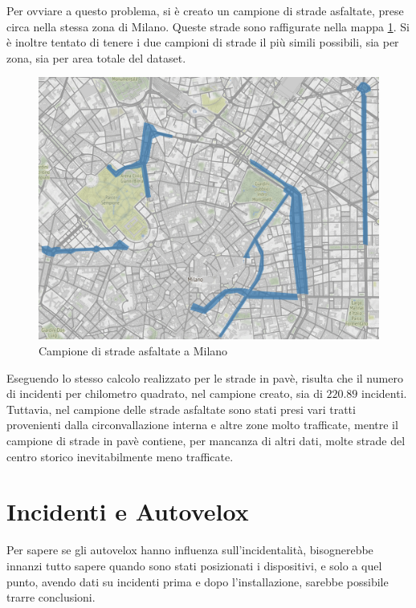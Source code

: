 \documentclass[a4paper]{report}
\begin{document}
Per ovviare a questo problema, si è creato un campione di strade asfaltate, prese circa 
nella stessa zona di Milano. 
Queste strade sono raffigurate nella mappa \ref{fig:mappa-asfalto}. 
Si è inoltre tentato di tenere i due campioni di strade il più simili possibili, sia per zona, 
sia per area totale del dataset.

\begin{figure}
    \includegraphics[width=\linewidth]{../src/pave/mappa_asfalto.png}
    \caption{Campione di strade asfaltate a Milano}
    \label{fig:mappa-asfalto}
\end{figure}

Eseguendo lo stesso calcolo realizzato per le strade in pavè, risulta che il numero di incidenti per 
chilometro quadrato, nel campione creato, sia di $220.89$ incidenti.
Tuttavia, nel campione delle strade asfaltate sono stati presi vari tratti provenienti dalla 
circonvallazione interna e altre zone molto trafficate, mentre il campione di strade in pavè 
contiene, per mancanza di altri dati, molte strade del centro storico inevitabilmente 
meno trafficate.

\section{Incidenti e Autovelox}

Per sapere se gli autovelox hanno influenza sull'incidentalità, 
bisognerebbe innanzi tutto sapere quando sono stati posizionati i dispositivi, e solo a quel punto, 
avendo dati su incidenti prima e dopo l'installazione, sarebbe possibile trarre conclusioni.
\end{document}
